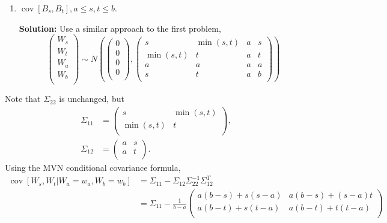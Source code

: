 \documentclass{article}[12pt]
\begin{document}
\begin{enumerate}
	\item $\operatorname{cov} \left[ B_s, B_t \right], a \le s, t \le b$.
		
		\textbf{Solution: }Use a similar approach to the first problem,
		\begin{equation}
			\begin{pmatrix}
				W_s \\
				W_t \\
				W_a \\
				W_b \\
			\end{pmatrix} \sim N \left( 
\begin{pmatrix}
	0 \\
	0 \\
	0 \\
	0 \\
\end{pmatrix}, 
\begin{pmatrix}
	s & \min (s, t) & a & s\\
	\min (s, t) & t & a & t \\
	a & a & a & a \\
	s & t & a & b \\
\end{pmatrix}
			\right)
		\end{equation}
\end{enumerate}
Note that $\Sigma_{22}$ is unchanged, but
\begin{equation}
	\begin{aligned}
		\Sigma_{11} &= \begin{pmatrix}
			s & \min (s, t)\\
			\min (s,t) & t \\
		\end{pmatrix},	\\
			\Sigma_{12} &= \begin{pmatrix}
				a & s \\
				a & t \\
			\end{pmatrix}.
	\end{aligned}
\end{equation}
Using the MVN conditional covariance formula,
\begin{equation}
	\begin{aligned}
		\operatorname{cov} \left[ W_s, W_t | W_a = w_a, W_b = w_b \right] &= \Sigma_{11} - \Sigma_{12} \Sigma_{22}^{-1} \Sigma_{12}^T \\
										  &= \Sigma_{11} - \frac{1}{b-a} \begin{pmatrix}
											  a(b-s) + s (s- a) & a (b-s) + (s-a)t \\
											  a (b-t) + s(t-a) & a (b-t) + t(t-a) \\
										  	
										  \end{pmatrix} 
	\end{aligned}
\end{equation}
\end{document}
